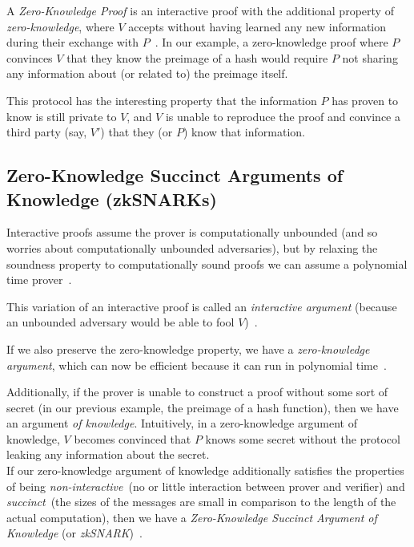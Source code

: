 A \textit{Zero-Knowledge Proof} is an interactive proof with the additional property of \textit{zero-knowledge}, where
$V$ accepts without having learned any new information during their exchange with $P$~\cite{damgaard1998zk_protocols,
    smart2016zeroknowledgeproofs}.
In our example, a zero-knowledge proof where $P$ convinces $V$ that they know the preimage of a hash would require $P$
not sharing any information about (or related to) the preimage itself.

This protocol has the interesting property that the information $P$ has proven to know is still private to $V$, and
$V$ is unable to reproduce the proof and convince a third party (say, $V'$) that they (or $P$) know that information.

\subsection{Zero-Knowledge Succinct Arguments of Knowledge (zkSNARKs)}\label{subsec:zksnarks}


Interactive proofs assume the prover is computationally unbounded (and so worries about computationally
unbounded adversaries), but by relaxing the soundness property to computationally sound proofs we can assume a
polynomial time prover~\cite{damgaard1998zk_protocols}.

This variation of an interactive proof is called an \textit{interactive argument} (because an unbounded adversary would
be able to fool $V$)~\cite{smart2016zeroknowledgeproofs}.

If we also preserve the zero-knowledge property, we have a \textit{zero-knowledge argument}, which can now be
efficient because it can run in polynomial time~\cite{naranker2022zeroknowledge}.

Additionally, if the prover is unable to construct a proof without some sort of secret (in our previous example, the
preimage of a hash function), then we have an argument \textit{of knowledge}.
Intuitively, in a zero-knowledge argument of knowledge, $V$ becomes convinced that $P$ knows some secret without the
protocol leaking any information about the secret.\\

If our zero-knowledge argument of knowledge additionally satisfies the properties of being \textit{non-interactive}~(no
or little interaction between prover and verifier) and \textit{succinct}~(the sizes of the messages are small in
comparison to the length of the actual computation), then we have a \textit{Zero-Knowledge Succinct Argument of
Knowledge} (or \textit{zkSNARK})~\cite{reitwiessner2016zksnarks}.


